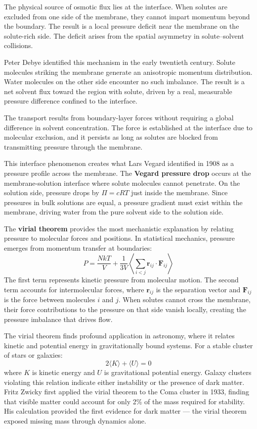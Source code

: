 The physical source of osmotic flux lies at the interface. When solutes are excluded from one side of the membrane, they cannot impart momentum beyond the boundary. The result is a local pressure deficit near the membrane on the solute-rich side. The deficit arises from the spatial asymmetry in solute–solvent collisions.

Peter Debye identified this mechanism in the early twentieth century. Solute molecules striking the membrane generate an anisotropic momentum distribution. Water molecules on the other side encounter no such imbalance. The result is a net solvent flux toward the region with solute, driven by a real, measurable pressure difference confined to the interface.

The transport results from boundary-layer forces without requiring a global difference in solvent concentration. The force is established at the interface due to molecular exclusion, and it persists as long as solutes are blocked from transmitting pressure through the membrane.

This interface phenomenon creates what Lars Vegard identified in 1908 as a pressure profile across the membrane. The \textbf{Vegard pressure drop} occurs at the membrane-solution interface where solute molecules cannot penetrate. On the solution side, pressure drops by $\Pi = cRT$ just inside the membrane. Since pressures in bulk solutions are equal, a pressure gradient must exist within the membrane, driving water from the pure solvent side to the solution side.

The \textbf{virial theorem} provides the most mechanistic explanation by relating pressure to molecular forces and positions. In statistical mechanics, pressure emerges from momentum transfer at boundaries:
\[
P = \frac{NkT}{V} + \frac{1}{3V}\left\langle \sum_{i<j} \mathbf{r}_{ij} \cdot \mathbf{F}_{ij} \right\rangle
\]
The first term represents kinetic pressure from molecular motion. The second term accounts for intermolecular forces, where $\mathbf{r}_{ij}$ is the separation vector and $\mathbf{F}_{ij}$ is the force between molecules $i$ and $j$. When solutes cannot cross the membrane, their force contributions to the pressure on that side vanish locally, creating the pressure imbalance that drives flow.

The virial theorem finds profound application in astronomy, where it relates kinetic and potential energy in gravitationally bound systems. For a stable cluster of stars or galaxies:
\[
2\langle K \rangle + \langle U \rangle = 0
\]
where $K$ is kinetic energy and $U$ is gravitational potential energy. Galaxy clusters violating this relation indicate either instability or the presence of dark matter. Fritz Zwicky first applied the virial theorem to the Coma cluster in 1933, finding that visible matter could account for only 2\% of the mass required for stability. His calculation provided the first evidence for dark matter — the virial theorem exposed missing mass through dynamics alone.

